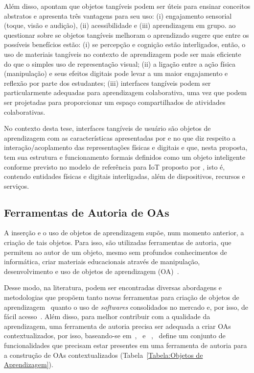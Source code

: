 Além disso, \cite{zuckerman:2005} apontam que objetos tangíveis podem ser úteis para ensinar conceitos abstratos e apresenta três vantagens para seu uso: (i) engajamento sensorial (toque, visão e audição), (ii) acessibilidade e (iii) aprendizagem em grupo. \cite{marshall:2007} ao questionar sobre se objetos tangíveis melhoram o aprendizado sugere que entre os possíveis benefícios estão: (i) se percepção e cognição estão interligados, então, o uso de materiais tangíveis no contexto de aprendizagem pode ser mais eficiente do que o simples uso de representação visual;  (ii) a ligação entre a ação física (manipulação) e seus efeitos digitais pode levar a um maior engajamento e reflexão por parte dos estudantes; (iii) interfaces tangíveis podem ser particularmente adequadas para aprendizagem colaborativa, uma vez que podem ser projetadas para proporcionar um espaço compartilhados de atividades colaborativas.

No contexto desta tese, interfaces tangíveis de usuário são objetos de aprendizagem com as características apresentadas por \cite{ullmer:2000} e \cite{zhou:2015} no que diz respeito a interação/acoplamento das representações físicas e digitais e que, nesta proposta, tem sua estrutura e funcionamento formais definidos como um objeto inteligente conforme previsto no modelo de referência para IoT proposto por \cite{serbanati:2011}, isto é, contendo entidades físicas e digitais interligadas, além de dispositivos, recursos e serviços.

\subsection{Ferramentas de Autoria de OAs}\label{section:ferramentasautoria_avaliacao}
A inserção e o uso de objetos de aprendizagem supõe, num momento anterior, a criação de tais objetos. Para isso, são utilizadas ferramentas de autoria, que permitem ao autor de um objeto, mesmo sem profundos conhecimentos de informática, criar materiais educacionais através de manipulação, desenvolvimento e uso de objetos de aprendizagem (OA)~\citep{Flores:2011}.

Desse modo, na literatura, podem ser encontradas diversas abordagens e metodologias que propõem tanto novas ferramentas para criação de objetos de aprendizagem~\citep{Orlandi:2012,Flores:2011} quanto o uso de \textit{softwares} consolidados no mercado e, por isso, de fácil acesso~\citep{Passos:2010}. Além disso, para melhor contribuir com a qualidade da aprendizagem, uma ferramenta de autoria precisa ser adequada a criar OAs contextualizados, por isso, baseando-se em~\cite{Kolb:2014},~\cite{Gagne:2013} e ~\cite{Wiley:2000},~\cite{Flores:2011} define um conjunto de funcionalidades que precisam estar presentes em uma ferramenta de autoria para a construção de OAs contextualizados (Tabela~\ref{Tabela:Objetos de Aprendizagem}).

